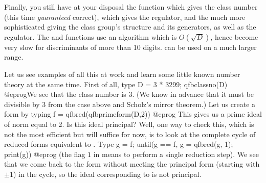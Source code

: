 Finally, you still have at your disposal the function  which
gives the class number (this time \emph{guaranteed} correct),
 which gives the regulator, and the much more sophisticated
 giving the class group's structure and its generators,
as well as the regulator. The  and 
functions use an algorithm which is $O(\sqrt D)$, hence become very slow for
discriminants of more than 10 digits.  can be used on a
much larger range.

Let us see examples of all this at work and learn some little known number
theory at the same time. First of all, type
\bprog
  D = 3 * 3299; qfbclassno(D)
@eprog\noindent We see that the class number is 3. (We know
in advance that it must be divisible by 3 from the  case above
and Scholz's mirror theorem.) Let us create a form by typing
\bprog
  f = qfbred(qfbprimeform(D,2))
@eprog\noindent
This gives us a prime ideal of norm equal to 2. Is this ideal principal?
Well, one way to check this, which is not the most efficient but will suffice
for now, is to look at the complete cycle of reduced forms equivalent to
. Type
\bprog
 g = f; until(g == f, g = qfbred(g, 1); print(g))
@eprog\noindent
(the flag $1$ in  means to perform a single reduction step). We
see that we come back to the form  without meeting the principal form
(starting with $\pm1$) in the cycle, so the ideal corresponding to  is
not principal.

